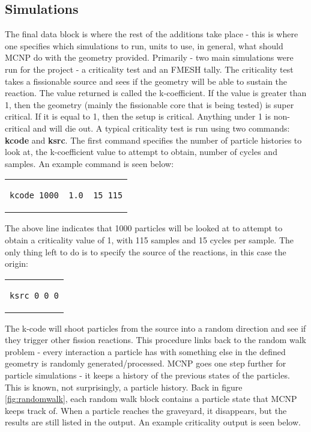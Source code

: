 \subsection{Simulations}
The final data block is where the rest of the additions take place - this is where one specifies which simulations to run, units to use, in general, what should MCNP do with the geometry provided. Primarily - two main simulations were run for the project - a criticality test and an FMESH tally. The criticality test takes a fissionable source and sees if the geometry will be able to sustain the reaction. The value returned is called the k-coefficient. If the value is greater than 1, then the geometry (mainly the fissionable core that is being tested) is super critical. If it is equal to 1, then the setup is critical. Anything under 1 is non-critical and will die out. A typical criticality test is run using two commands: \textbf{kcode} and \textbf{ksrc}. The first command specifies the number of particle histories to look at, the k-coefficient value to attempt to obtain, number of cycles and samples. An example command is seen below:
\begin{center}
\begin{tabular}{c}
\begin{lstlisting}
kcode 1000  1.0  15 115
\end{lstlisting}
\end{tabular}
\end{center}
The above line indicates that 1000 particles will be looked at to attempt to obtain a criticality value of 1, with 115 samples and 15 cycles per sample. The only thing left to do is to specify the source of the reactions, in this case the origin:
\begin{center}
\begin{tabular}{c}
\begin{lstlisting}
ksrc 0 0 0
\end{lstlisting}
\end{tabular}
\end{center}
The k-code will shoot particles from the source into a random direction and see if they trigger other fission reactions. This procedure links back to the random walk problem - every interaction a particle has with something else in the defined geometry is randomly generated/processed. MCNP goes one step further for particle simulations - it keeps a history of the previous states of the particles. This is known, not surprisingly, a particle history. Back in figure \ref{fig:randomwalk}, each random walk block contains a particle state that MCNP keeps track of. When a particle reaches the graveyard, it disappears, but the results are still listed in the output. An example criticality output is seen below.

